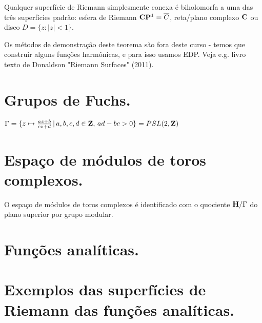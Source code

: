 \begin{teorema}
Qualquer superfície de Riemann simplesmente conexa é biholomorfa a uma das três superfícies padrão:
esfera de Riemann $\mathbf{C}\mathbf{P}^1 = \overline{C}$, reta/plano complexo $\mathbf{C}$ ou disco $D = \{z : |z|<1\}$.
\end{teorema}
Os métodos de demonstração deste teorema são fora deste curso - temos que construir alguns funções
harmônicas, e para isso usamos EDP. Veja e.g. livro texto de Donaldson "Riemann Surfaces" (2011).

\section{Grupos de Fuchs.}

\begin{exem}
$\Gamma = \{ z \mapsto \frac{az+b}{cz+d} \,|\, a,b,c,d\in\mathbf{Z}, \, ad-bc>0 \} = PSL(2,\mathbf{Z})$
\end{exem}

\section{Espaço de módulos de toros complexos.}

\begin{teorema}
O espaço de módulos de toros complexos é identificado com o quociente $\mathbf{H}/\Gamma$
do plano superior por grupo modular.
\end{teorema}

\section{Funções analíticas.}

\section{Exemplos das superfícies de Riemann das funções analíticas.}
